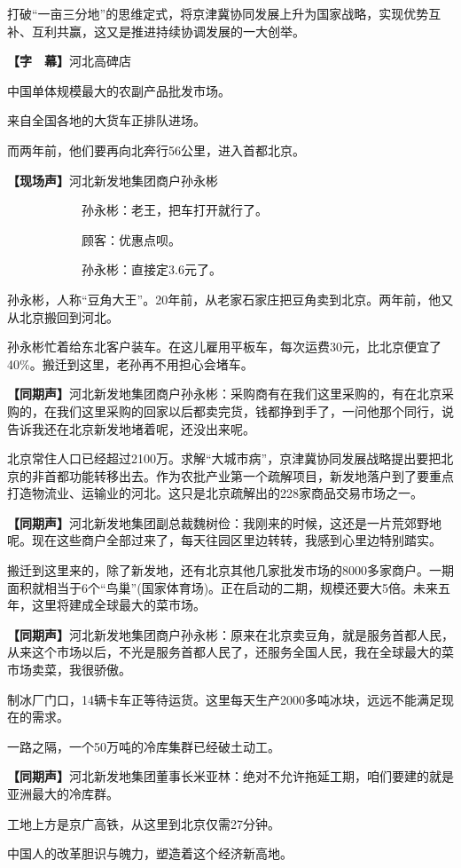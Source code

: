 \documentclass{ctexart}
\newcommand{\zkh}[1]{\textbf{\hspace{-2.7em} 【#1】}}
\begin{document}
打破``一亩三分地''的思维定式，将京津冀协同发展上升为国家战略，实现优势互补、互利共赢，这又是推进持续协调发展的一大创举。

\zkh{字　幕}河北高碑店

中国单体规模最大的农副产品批发市场。

来自全国各地的大货车正排队进场。

而两年前，他们要再向北奔行56公里，进入首都北京。

\zkh{现场声}河北新发地集团商户孙永彬

　　　　　　孙永彬：老王，把车打开就行了。

　　　　　　顾客：优惠点呗。

　　　　　　孙永彬：直接定3.6元了。

孙永彬，人称``豆角大王''。20年前，从老家石家庄把豆角卖到北京。两年前，他又从北京搬回到河北。

孙永彬忙着给东北客户装车。在这儿雇用平板车，每次运费30元，比北京便宜了40{\%}。搬迁到这里，老孙再不用担心会堵车。

\zkh{同期声}河北新发地集团商户孙永彬：采购商有在我们这里采购的，有在北京采购的，在我们这里采购的回家以后都卖完货，钱都挣到手了，一问他那个同行，说告诉我还在北京新发地堵着呢，还没出来呢。

北京常住人口已经超过2100万。求解``大城市病''，京津冀协同发展战略提出要把北京的非首都功能转移出去。作为农批产业第一个疏解项目，新发地落户到了要重点打造物流业、运输业的河北。这只是北京疏解出的228家商品交易市场之一。

\zkh{同期声}河北新发地集团副总裁魏树俭：我刚来的时候，这还是一片荒郊野地呢。现在这些商户全部过来了，每天往园区里边转转，我感到心里边特别踏实。

搬迁到这里来的，除了新发地，还有北京其他几家批发市场的8000多家商户。一期面积就相当于6个``鸟巢''(国家体育场)。正在启动的二期，规模还要大5倍。未来五年，这里将建成全球最大的菜市场。

\zkh{同期声}河北新发地集团商户孙永彬：原来在北京卖豆角，就是服务首都人民，从来这个市场以后，不光是服务首都人民了，还服务全国人民，我在全球最大的菜市场卖菜，我很骄傲。

制冰厂门口，14辆卡车正等待运货。这里每天生产2000多吨冰块，远远不能满足现在的需求。

一路之隔，一个50万吨的冷库集群已经破土动工。

\zkh{同期声}河北新发地集团董事长米亚林：绝对不允许拖延工期，咱们要建的就是亚洲最大的冷库群。

工地上方是京广高铁，从这里到北京仅需27分钟。

中国人的改革胆识与魄力，塑造着这个经济新高地。
\end{document}
